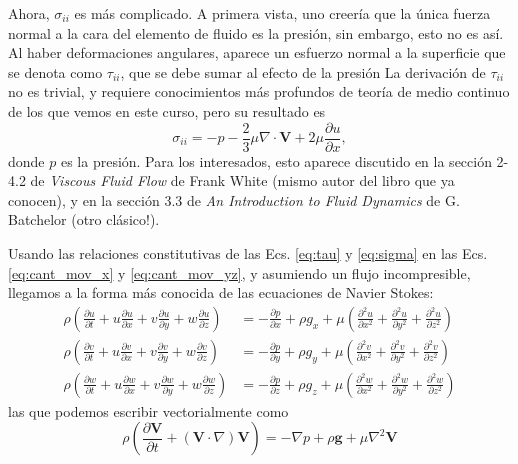 Ahora, $\sigma_{ii}$ es más complicado.
A primera vista, uno creería que la única fuerza normal a la cara del elemento de fluido es la presión, sin embargo, esto no es así.
Al haber deformaciones angulares, aparece un esfuerzo normal a la superficie que se denota como $\tau_{ii}$, que se debe sumar al efecto de la presión
La derivación de $\tau_{ii}$ no es trivial, y requiere conocimientos más profundos de teoría de medio continuo de los que vemos en este curso, pero su resultado es
%
\begin{equation}\label{eq:sigma}
\sigma_{ii} = -p-\frac{2}{3}\mu\nabla\cdot\mathbf{V} + 2\mu\frac{\partial u}{\partial x},
\end{equation}
%
donde $p$ es la presión.
Para los interesados, esto aparece discutido en la sección 2-4.2 de \emph{Viscous Fluid Flow} de Frank White (mismo autor del libro que ya conocen), y en la sección 3.3 de \emph{An Introduction to Fluid Dynamics} de G. Batchelor (otro clásico!).

Usando las relaciones constitutivas de las Ecs. \eqref{eq:tau} y \eqref{eq:sigma} en las Ecs. \eqref{eq:cant_mov_x} y \eqref{eq:cant_mov_yz}, y asumiendo un flujo incompresible, llegamos a la forma más conocida de las ecuaciones de Navier Stokes:
%
\begin{align}\label{eq:NS_componente}
\rho\left(\frac{\partial u}{\partial t} + u\frac{\partial u}{\partial x} + v\frac{\partial u}{\partial y} + w\frac{\partial u}{\partial z} \right) &= -\frac{\partial p}{\partial x} + \rho g_x + \mu\left(\frac{\partial^2 u}{\partial x^2} + \frac{\partial^2 u}{\partial y^2} + \frac{\partial^2 u}{\partial z^2}\right)\nonumber \\
\rho\left(\frac{\partial v}{\partial t} + u\frac{\partial v}{\partial x} + v\frac{\partial v}{\partial y} + w\frac{\partial v}{\partial z} \right) &= -\frac{\partial p}{\partial y} + \rho g_y + \mu\left(\frac{\partial^2 v}{\partial x^2} + \frac{\partial^2 v}{\partial y^2} + \frac{\partial^2 v}{\partial z^2}\right)\nonumber \\
\rho\left(\frac{\partial w}{\partial t} + u\frac{\partial w}{\partial x} + v\frac{\partial w}{\partial y} + w\frac{\partial w}{\partial z} \right) &= -\frac{\partial p}{\partial z} + \rho g_z + \mu\left(\frac{\partial^2 w}{\partial x^2} + \frac{\partial^2 w}{\partial y^2} + \frac{\partial^2 w}{\partial z^2}\right)
\end{align}
%
las que podemos escribir vectorialmente como
%
\begin{equation}\label{eq:NS}
\rho\left(\frac{\partial \mathbf{V}}{\partial t} + (\mathbf{V}\cdot\nabla)\mathbf{V} \right) = -\nabla p + \rho \mathbf{g} + \mu\nabla^2\mathbf{V}
\end{equation}

